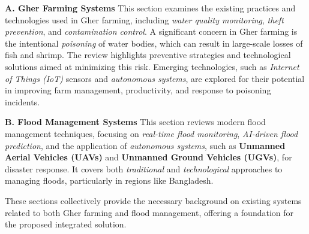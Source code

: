\documentclass[conference]{IEEEtran}
\begin{document}
\textbf{A. Gher Farming Systems}
This section examines the existing practices and technologies used in Gher farming, including \textit{water quality monitoring}, \textit{theft prevention}, and \textit{contamination control}. A significant concern in Gher farming is the intentional \textit{poisoning} of water bodies, which can result in large-scale losses of fish and shrimp. The review highlights preventive strategies and technological solutions aimed at minimizing this risk. Emerging technologies, such as \textit{Internet of Things (IoT)} sensors and \textit{autonomous systems}, are explored for their potential in improving farm management, productivity, and response to poisoning incidents.

\textbf{B. Flood Management Systems}
This section reviews modern flood management techniques, focusing on \textit{real-time flood monitoring}, \textit{AI-driven flood prediction}, and the application of \textit{autonomous systems}, such as \textbf{Unmanned Aerial Vehicles (UAVs)} and \textbf{Unmanned Ground Vehicles (UGVs)}, for disaster response. It covers both \textit{traditional} and \textit{technological} approaches to managing floods, particularly in regions like Bangladesh.

These sections collectively provide the necessary background on existing systems related to both Gher farming and flood management, offering a foundation for the proposed integrated solution.
\end{document}
